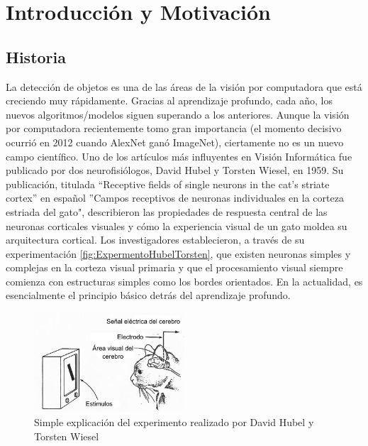 \chapter{Introducción y Motivación}

\section{Historia}
La detección de objetos es una de las áreas de la visión por computadora que está creciendo muy rápidamente. Gracias al aprendizaje profundo, cada año, los nuevos algoritmos/modelos siguen superando a los anteriores. Aunque la visión por computadora recientemente tomo gran importancia (el momento decisivo ocurrió en 2012 cuando AlexNet ganó ImageNet), ciertamente no es un nuevo campo científico. Uno de los artículos más influyentes en Visión Informática fue publicado por dos neurofisiólogos, David Hubel y Torsten Wiesel, en 1959. Su publicación, titulada “Receptive fields of single neurons in the cat’s striate cortex” en español ”Campos receptivos de neuronas individuales en la corteza estriada del gato", describieron las propiedades de respuesta central de las neuronas corticales visuales y cómo la experiencia visual de un gato moldea su arquitectura cortical. Los investigadores establecieron, a través de su experimentación \autoref{fig:ExpermentoHubelTorsten}, que existen neuronas simples y complejas en la corteza visual primaria y que el procesamiento visual siempre comienza con estructuras simples como los bordes orientados. En la actualidad, es esencialmente el principio básico detrás del aprendizaje profundo.\\
\begin{figure}
	\centering
	\includegraphics[width=0.5\textwidth]{img/cat.jpg}
	\caption{Simple explicación del experimento realizado por David Hubel y Torsten Wiesel}
	\label{fig:ExpermentoHubelTorsten}
\end{figure}


